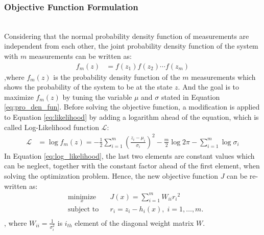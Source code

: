 \subsubsection{Objective Function Formulation}
\\Considering that the normal probability density function of measurements are independent from each other, the joint probability density function of the system with $m$ measurements can be written as:
\begin{align}
    f_m(z) &= f(z_1)f(z_2) \cdots f(z_m)
    \label{eq:likelihood}
\end{align}
,where $f_m(z)$ is the probability density function of the $m$ measurements which shows the probability of the system to be at the state $z$. And the goal is to maximize $f_m(z)$ by tuning the variable $\mu$ and $\sigma$ stated in Equation \ref{eq:pro_den_fun}. Before solving the objective function, a modification is applied to Equation \ref{eq:likelihood} by adding a logarithm ahead of the equation, which is called Log-Likelihood function $\mathcal{L}$:
\begin{align}
    \mathcal{L} &=\log f_m(z) 
    = -\frac{1}{2} \sum_{i=1}^{m} \left(\frac{z_i-\mu_i}{\sigma_i} \right)^2-\frac{m}{2}\log 2\pi- \sum_{i=1}^{m} \log \sigma_i
    \label{eq:log_likelihood}
\end{align}
In Equation \ref{eq:log_likelihood}, the last two elements are constant values which can be neglect, together with the constant factor ahead of the first element, when solving the optimization problem. Hence, the new objective function $J$ can be re-written as:
\begin{equation}
    \begin{aligned}
    & \underset{x}{\text{minimize}}
    & & J(x)=\sum_{i=1}^{m} W_{ii} {r_i} ^2 \\
    & \text{subject to}
    & & r_i = z_i-h_i(x), \; i = 1, \ldots, m.\\
    \label{eq:obj_fun_WLS}
    \end{aligned}
\end{equation}
, where $W_{ii}=\frac{1}{\sigma_{i}^2}$ is $i_{th}$ element of the diagonal weight matrix $W$.   

